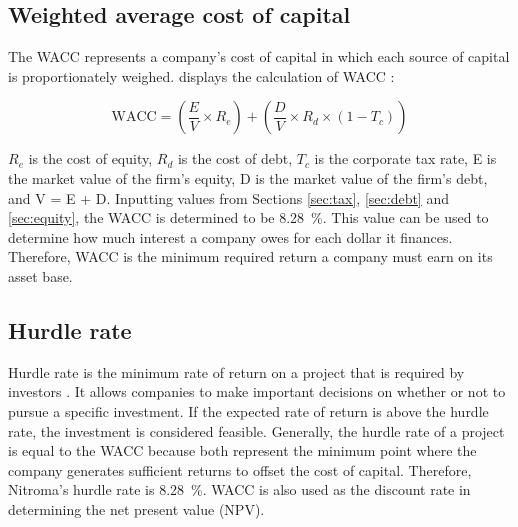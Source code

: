 \subsection{Weighted average cost of capital}
\label{sec:wacc}
The WACC represents a company’s cost of capital in which each source of capital is proportionately weighed.  displays the calculation of WACC \cite{dikov_understanding_2021}:

\begin{equation}
\label{eqn:wacc}
    \mathrm{WACC}=\left(\frac{E}{V}\times R_{e}\right)+\left(\frac{D}{V}\times R_{d}\times (1-T_{c})\right)
\end{equation}

$R_{e}$ is the cost of equity, $R_{d}$ is the cost of debt, $T_{c}$ is the corporate tax rate, E is the market value of the firm’s equity, D is the market value of the firm’s debt, and V = E + D. Inputting values from Sections \ref{sec:tax}, \ref{sec:debt} and \ref{sec:equity}, the WACC is determined to be \SI{8.28}{\percent}. This value can be used to determine how much interest a company owes for each dollar it finances. Therefore, WACC is the minimum required return a company must earn on its asset base. 

\subsection{Hurdle rate}
Hurdle rate is the minimum rate of return on a project that is required by investors \cite{kenton_hurdle_nodate}. It allows companies to make important decisions on whether or not to pursue a specific investment. If the expected rate of return is above the hurdle rate, the investment is considered feasible. Generally, the hurdle rate of a project is equal to the WACC because both represent the minimum point where the company generates sufficient returns to offset the cost of capital. Therefore, Nitroma's hurdle rate is \SI{8.28}{\percent}. WACC is also used as the discount rate in determining the net present value (NPV).